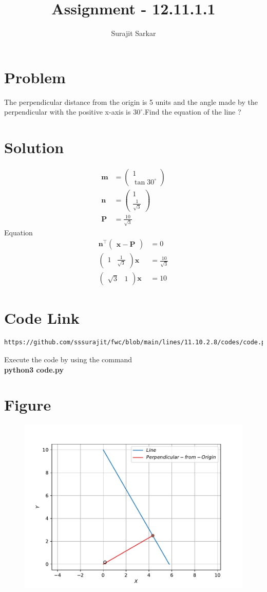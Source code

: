\documentclass[journal,12pt,twocolumn]{IEEEtran}
\title{\mytitle}
\title{
Assignment - 12.11.1.1
}
\author{Surajit Sarkar}
\newcommand{\myvec}[1]{\ensuremath{\begin{pmatrix}#1\end{pmatrix}}}
\let\vec\mathbf
\begin{document}
\maketitle
\tableofcontents
\bigskip
\section{\textbf{Problem}}
The perpendicular distance from the origin is 5 units and the angle made by the perpendicular with the positive x-axis is $30^{\circ}$.Find the equation of the line ?
\section{\textbf{Solution}}
\begin{align}
\vec{m}&=\myvec{1\\\tan30^{\circ}}\\
\vec{n}&=\myvec{1\\\frac{1}{\sqrt{3}}}\\
\vec{P}&=\frac{10}{\sqrt{3}}
\end{align}
Equation
\begin{align}
    \vec{n}^{\top}\myvec{\vec{x}-\vec{P}}&=0\\
    \myvec{1&\frac{1}{\sqrt{3}}}\vec{x}&=\frac{10}{\sqrt{3}}\\
    \myvec{\sqrt{3}&1}\vec{x}&=10
\end{align}
\section{\textbf{Code Link}}
\begin{lstlisting}
https://github.com/sssurajit/fwc/blob/main/lines/11.10.2.8/codes/code.py
\end{lstlisting}
Execute the code by using the command\\
\textbf{python3 code.py}\\
\section{\textbf{Figure}}
\begin{figure}[!h]
\centering
\includegraphics[width=\columnwidth]{fig.pdf}
\caption{}
\label{fig:vec}
\end{figure}
\end{document}
